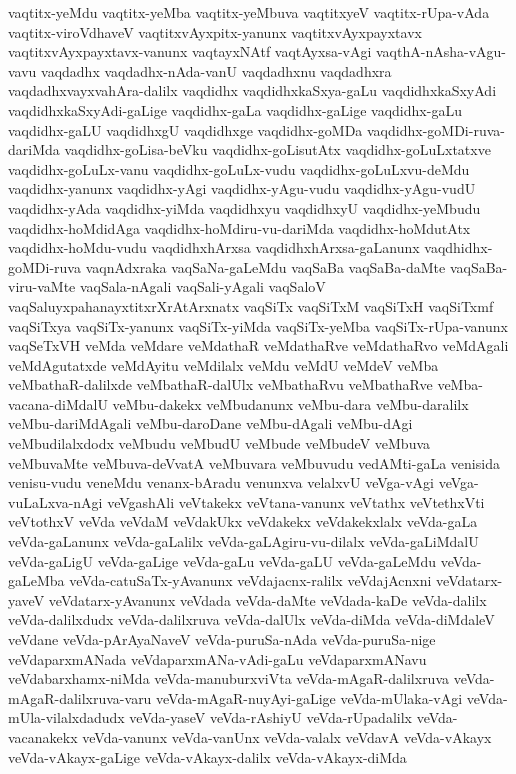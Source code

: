 {vaqtitx-yeMdu
vaqtitx-yeMba
vaqtitx-yeMbuva
vaqtitxyeV
vaqtitx-rUpa-vAda
vaqtitx-viroVdhaveV
vaqtitxvAyxpitx-yanunx
vaqtitxvAyxpayxtavx
vaqtitxvAyxpayxtavx-vanunx
vaqtayxNAtf
vaqtAyxsa-vAgi
vaqthA-nAsha-vAgu-vavu
vaqdadhx
vaqdadhx-nAda-vanU
vaqdadhxnu
vaqdadhxra
vaqdadhxvayxvahAra-dalilx
vaqdidhx
vaqdidhxkaSxya-gaLu
vaqdidhxkaSxyAdi
vaqdidhxkaSxyAdi-gaLige
vaqdidhx-gaLa
vaqdidhx-gaLige
vaqdidhx-gaLu
vaqdidhx-gaLU
vaqdidhxgU
vaqdidhxge
vaqdidhx-goMDa
vaqdidhx-goMDi-ruva-dariMda
vaqdidhx-goLisa-beVku
vaqdidhx-goLisutAtx
vaqdidhx-goLuLxtatxve
vaqdidhx-goLuLx-vanu
vaqdidhx-goLuLx-vudu
vaqdidhx-goLuLxvu-deMdu
vaqdidhx-yanunx
vaqdidhx-yAgi
vaqdidhx-yAgu-vudu
vaqdidhx-yAgu-vudU
vaqdidhx-yAda
vaqdidhx-yiMda
vaqdidhxyu
vaqdidhxyU
vaqdidhx-yeMbudu
vaqdidhx-hoMdidAga
vaqdidhx-hoMdiru-vu-dariMda
vaqdidhx-hoMdutAtx
vaqdidhx-hoMdu-vudu
vaqdidhxhArxsa
vaqdidhxhArxsa-gaLanunx
vaqdhidhx-goMDi-ruva
vaqnAdxraka
vaqSaNa-gaLeMdu
vaqSaBa
vaqSaBa-daMte
vaqSaBa-viru-vaMte
vaqSala-nAgali
vaqSali-yAgali
vaqSaloV
vaqSaluyxpahanayxtitxrXrAtArxnatx
vaqSiTx
vaqSiTxM
vaqSiTxH
vaqSiTxmf
vaqSiTxya
vaqSiTx-yanunx
vaqSiTx-yiMda
vaqSiTx-yeMba
vaqSiTx-rUpa-vanunx
vaqSeTxVH
veMda
veMdare
veMdathaR
veMdathaRve
veMdathaRvo
veMdAgali
veMdAgutatxde
veMdAyitu
veMdilalx
veMdu
veMdU
veMdeV
veMba
veMbathaR-dalilxde
veMbathaR-dalUlx
veMbathaRvu
veMbathaRve
veMba-vacana-diMdalU
veMbu-dakekx
veMbudanunx
veMbu-dara
veMbu-daralilx
veMbu-dariMdAgali
veMbu-daroDane
veMbu-dAgali
veMbu-dAgi
veMbudilalxdodx
veMbudu
veMbudU
veMbude
veMbudeV
veMbuva
veMbuvaMte
veMbuva-deVvatA
veMbuvara
veMbuvudu
vedAMti-gaLa
venisida
venisu-vudu
veneMdu
venanx-bAradu
venunxva
velalxvU
veVga-vAgi
veVga-vuLaLxva-nAgi
veVgashAli
veVtakekx
veVtana-vanunx
veVtathx
veVtethxVti
veVtothxV
veVda
veVdaM
veVdakUkx
veVdakekx
veVdakekxlalx
veVda-gaLa
veVda-gaLanunx
veVda-gaLalilx
veVda-gaLAgiru-vu-dilalx
veVda-gaLiMdalU
veVda-gaLigU
veVda-gaLige
veVda-gaLu
veVda-gaLU
veVda-gaLeMdu
veVda-gaLeMba
veVda-catuSaTx-yAvanunx
veVdajacnx-ralilx
veVdajAcnxni
veVdatarx-yaveV
veVdatarx-yAvanunx
veVdada
veVda-daMte
veVdada-kaDe
veVda-dalilx
veVda-dalilxdudx
veVda-dalilxruva
veVda-dalUlx
veVda-diMda
veVda-diMdaleV
veVdane
veVda-pArAyaNaveV
veVda-puruSa-nAda
veVda-puruSa-nige
veVdaparxmANada
veVdaparxmANa-vAdi-gaLu
veVdaparxmANavu
veVdabarxhamx-niMda
veVda-manuburxviVta
veVda-mAgaR-dalilxruva
veVda-mAgaR-dalilxruva-varu
veVda-mAgaR-nuyAyi-gaLige
veVda-mUlaka-vAgi
veVda-mUla-vilalxdadudx
veVda-yaseV
veVda-rAshiyU
veVda-rUpadalilx
veVda-vacanakekx
veVda-vanunx
veVda-vanUnx
veVda-valalx
veVdavA
veVda-vAkayx
veVda-vAkayx-gaLige
veVda-vAkayx-dalilx
veVda-vAkayx-diMda
}
